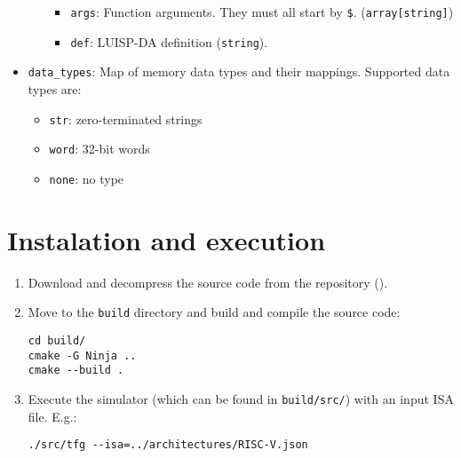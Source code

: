 \begin{itemize}[nosep,noitemsep]
\begin{itemize}
      \begin{itemize}[nosep,noitemsep]
        \item \texttt{args}: Function arguments. They must all start by \texttt{\$}. (\texttt{array[string]})
        \item \texttt{def}: LUISP-DA definition (\texttt{string}).
      \end{itemize}
    \end{itemize}
  \item \texttt{data\_types}: Map of memory data types and their mappings.  
      Supported data types are:
      \begin{itemize}[nosep,noitemsep]
        \item \texttt{str}: zero-terminated strings
        \item \texttt{word}: 32-bit words
        \item \texttt{none}: no type
      \end{itemize}
\end{itemize}


\section{Instalation and execution}

\begin{enumerate}
  \item Download and decompress the source code from the repository (\myrepo).
  \item Move to the \texttt{build} directory and build and compile the source code:
  \begin{tcolorbox}[bottom=-8pt]
    \begin{verbatim}
cd build/
cmake -G Ninja ..
cmake --build .
    \end{verbatim}
  \end{tcolorbox}
  \item Execute the simulator (which can be found in \texttt{build/src/}) with an input \gls{ISA} file. E.g.:
  \begin{tcolorbox}[bottom=-8pt]
    \begin{verbatim}
./src/tfg --isa=../architectures/RISC-V.json
    \end{verbatim}
  \end{tcolorbox}
\end{enumerate}